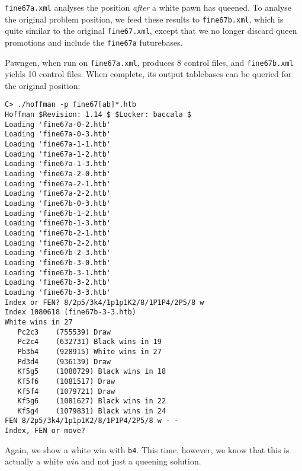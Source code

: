 \documentclass[11pt]{article}
\begin{document}
{\tt fine67a.xml} analyses the position {\it after} a white pawn has
queened.  To analyse the original problem position, we feed these
results to {\tt fine67b.xml}, which is quite similar to the original
{\tt fine67.xml}, except that we no longer discard queen promotions
and include the {\tt fine67a} futurebases.

Pawngen, when run on {\tt fine67a.xml}, produces 8 control files, and
{\tt fine67b.xml} yields 10 control files.  When complete, its output
tablebases can be queried for the original position:

\begin{verbatim}
C> ./hoffman -p fine67[ab]*.htb
Hoffman $Revision: 1.14 $ $Locker: baccala $
Loading 'fine67a-0-2.htb'
Loading 'fine67a-0-3.htb'
Loading 'fine67a-1-1.htb'
Loading 'fine67a-1-2.htb'
Loading 'fine67a-1-3.htb'
Loading 'fine67a-2-0.htb'
Loading 'fine67a-2-1.htb'
Loading 'fine67a-2-2.htb'
Loading 'fine67b-0-3.htb'
Loading 'fine67b-1-2.htb'
Loading 'fine67b-1-3.htb'
Loading 'fine67b-2-1.htb'
Loading 'fine67b-2-2.htb'
Loading 'fine67b-2-3.htb'
Loading 'fine67b-3-0.htb'
Loading 'fine67b-3-1.htb'
Loading 'fine67b-3-2.htb'
Loading 'fine67b-3-3.htb'
Index or FEN? 8/2p5/3k4/1p1p1K2/8/1P1P4/2P5/8 w
Index 1080618 (fine67b-3-3.htb)
White wins in 27
   Pc2c3    (755539) Draw
   Pc2c4    (632731) Black wins in 19
   Pb3b4    (928915) White wins in 27
   Pd3d4    (936139) Draw
   Kf5g5    (1080729) Black wins in 18
   Kf5f6    (1081517) Draw
   Kf5f4    (1079721) Draw
   Kf5g6    (1081627) Black wins in 22
   Kf5g4    (1079831) Black wins in 24
FEN 8/2p5/3k4/1p1p1K2/8/1P1P4/2P5/8 w - -
Index, FEN or move? 
\end{verbatim}

Again, we show a white win with {\tt b4}.  This time, however, we know
that this is actually a white {\it win} and not just a queening
solution.

\end{document}

